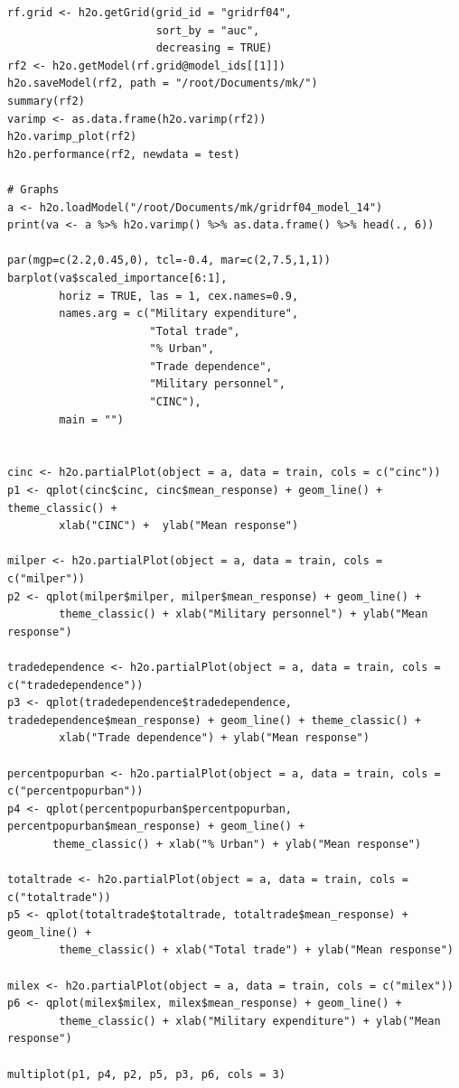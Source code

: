 \begin{verbatim}
rf.grid <- h2o.getGrid(grid_id = "gridrf04",
                       sort_by = "auc",
                       decreasing = TRUE)
rf2 <- h2o.getModel(rf.grid@model_ids[[1]])
h2o.saveModel(rf2, path = "/root/Documents/mk/")
summary(rf2)
varimp <- as.data.frame(h2o.varimp(rf2))
h2o.varimp_plot(rf2)
h2o.performance(rf2, newdata = test)

# Graphs
a <- h2o.loadModel("/root/Documents/mk/gridrf04_model_14")
print(va <- a %>% h2o.varimp() %>% as.data.frame() %>% head(., 6)) 

par(mgp=c(2.2,0.45,0), tcl=-0.4, mar=c(2,7.5,1,1))
barplot(va$scaled_importance[6:1],
        horiz = TRUE, las = 1, cex.names=0.9,
        names.arg = c("Military expenditure",
                      "Total trade", 
                      "% Urban",
                      "Trade dependence",
                      "Military personnel",
                      "CINC"),
        main = "")


cinc <- h2o.partialPlot(object = a, data = train, cols = c("cinc"))
p1 <- qplot(cinc$cinc, cinc$mean_response) + geom_line() + theme_classic() + 
        xlab("CINC") +  ylab("Mean response")

milper <- h2o.partialPlot(object = a, data = train, cols = c("milper"))
p2 <- qplot(milper$milper, milper$mean_response) + geom_line() +
        theme_classic() + xlab("Military personnel") + ylab("Mean response")

tradedependence <- h2o.partialPlot(object = a, data = train, cols = c("tradedependence"))
p3 <- qplot(tradedependence$tradedependence, tradedependence$mean_response) + geom_line() + theme_classic() +
        xlab("Trade dependence") + ylab("Mean response")

percentpopurban <- h2o.partialPlot(object = a, data = train, cols = c("percentpopurban"))
p4 <- qplot(percentpopurban$percentpopurban, percentpopurban$mean_response) + geom_line() +
       theme_classic() + xlab("% Urban") + ylab("Mean response")

totaltrade <- h2o.partialPlot(object = a, data = train, cols = c("totaltrade"))
p5 <- qplot(totaltrade$totaltrade, totaltrade$mean_response) + geom_line() +
        theme_classic() + xlab("Total trade") + ylab("Mean response")

milex <- h2o.partialPlot(object = a, data = train, cols = c("milex"))
p6 <- qplot(milex$milex, milex$mean_response) + geom_line() +
        theme_classic() + xlab("Military expenditure") + ylab("Mean response")

multiplot(p1, p4, p2, p5, p3, p6, cols = 3)


\end{verbatim}
